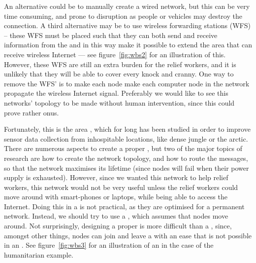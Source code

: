 
An alternative could be to manually create a wired network, but this can be very time consuming, and prone to disruption as people or vehicles may destroy the connection. A third alternative may be to use wireless forwarding stations (WFS) -- these WFS must be placed such that they can both send and receive information from the \wbs and in this way  make it possible to extend the area that can receive wireless Internet --- see  figure~\ref{fig:wbs2} for an illustration of this. However, these WFS are still an extra burden for the relief workers, and it is unlikely that they will be able to cover every knock and cranny. One way to remove the WFS' is to make each node make each computer node in the network propagate the wireless Internet signal. Preferably we would like to see this networks' topology to be made without human intervention, since this could prove rather onus. 

Fortunately, this is the area \anet, which for long has been studied in order to improve sensor data collection from inhospitable locations, like dense jungle or the arctic. There are numerous aspects to create a proper \anet, but two of the major topics of research are how to create the network topology, and how to route the messages, so that the network maximises its lifetime (since nodes will fail when their power supply is exhausted). However, since we wanted this network to help relief workers, this network would not be very useful unless the relief workers could move around with smart-phones or laptops, while being able to access the Internet. Doing this in a \anet is not practical, as they are optimised for a permanent network. Instead, we should try to use a \manet, which assumes that nodes move around. Not surprisingly, designing a proper \manet is more difficult than a \anet, since, amongst other things, nodes can join and leave a \manet with an ease that is not possible in an \anet. See figure~\ref{fig:wbs3} for an illustration of an \anet in the case of the humanitarian example.  


